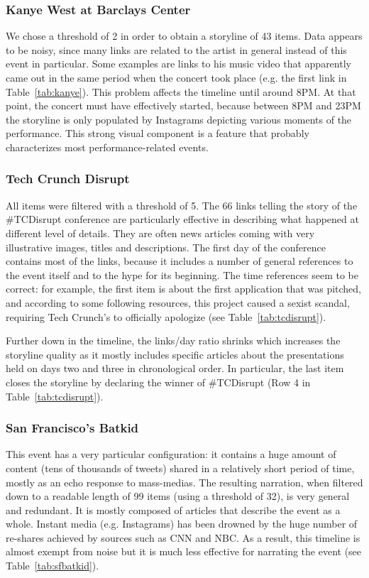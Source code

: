 \documentclass{sig-alternate}
\begin{document}
\subsubsection{Kanye West at Barclays Center}
We chose a threshold of 2 in order to obtain a storyline of 43 items. Data appears to be noisy, since many links are related to the artist in general instead of this event in particular. Some examples are links to his music video that apparently came out in the same period when the concert took place (e.g. the first link in Table~\ref{tab:kanye}). This problem affects the timeline until around 8PM. At that point, the concert must have effectively started, because between 8PM and 23PM the storyline is only populated by Instagrams depicting various moments of the performance. This strong visual component is a feature that probably characterizes most performance-related events.

\subsubsection{Tech Crunch Disrupt}
All items were filtered with a threshold of 5. The 66 links telling the story of the \#TCDisrupt conference are particularly effective in describing what happened at different level of details. They are often news articles coming with very illustrative images, titles and descriptions. The first day of the conference contains most of the links, because it includes a number of general references to the event itself and to the hype for its beginning. The time references seem to be correct: for example, the first item is about the first application that was pitched, and according to some following resources, this project caused a sexist scandal, requiring Tech Crunch's to officially apologize (see Table~\ref{tab:tcdisrupt}).

Further down in the timeline, the links/day ratio shrinks which increases the storyline quality as it mostly includes specific articles about the presentations held on days two and three in chronological order. In particular, the last item closes the storyline by declaring the winner of \#TCDisrupt (Row 4 in Table~\ref{tab:tcdisrupt}).

\subsubsection{San Francisco's Batkid}
This event has a very particular configuration: it contains a huge amount of content (tens of thousands of tweets) shared in a relatively short period of time, mostly as an echo response to mass-medias. The resulting narration, when filtered down to a readable length of 99 items (using a threshold of 32), is very general and redundant. It is mostly composed of articles that describe the event as a whole. Instant media (e.g. Instagrams) has been drowned by the huge number of re-shares achieved by sources such as CNN and NBC. As a result, this timeline is almost exempt from noise but it is much less effective for narrating the event (see Table~\ref{tab:sfbatkid}).
\end{document}
